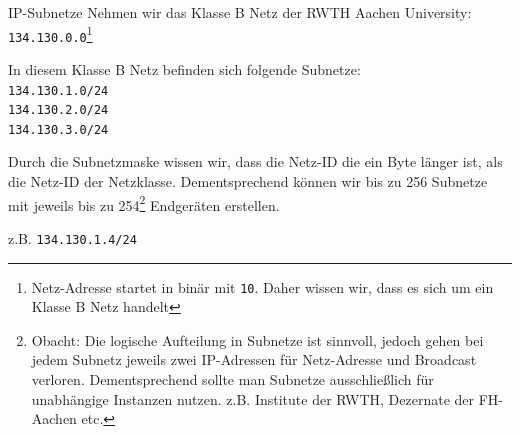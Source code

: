 \begin{example}{IP-Subnetze}
    Nehmen wir das Klasse B Netz der RWTH Aachen University:
    \texttt{134.130.0.0}\footnote{
        Netz-Adresse startet in binär mit \texttt{10}.
        Daher wissen wir, dass es sich um ein Klasse B Netz handelt
    }

    In diesem Klasse B Netz befinden sich folgende Subnetze:\\
    \texttt{134.130.1.0/24}\\
    \texttt{134.130.2.0/24}\\
    \texttt{134.130.3.0/24}

    Durch die Subnetzmaske wissen wir, dass die Netz-ID die ein Byte länger ist, als die Netz-ID der Netzklasse.
    Dementsprechend können wir bis zu 256 Subnetze mit jeweils bis zu 254\footnote{
        Obacht: Die logische Aufteilung in Subnetze ist sinnvoll, jedoch gehen bei jedem Subnetz jeweils zwei IP-Adressen für Netz-Adresse und Broadcast verloren.
        Dementsprechend sollte man Subnetze ausschließlich für unabhängige Instanzen nutzen.
        z.B. Institute der RWTH, Dezernate der FH-Aachen etc.
    } Endgeräten erstellen.

    z.B. \texttt{134.130.1.4/24}


\end{example}
